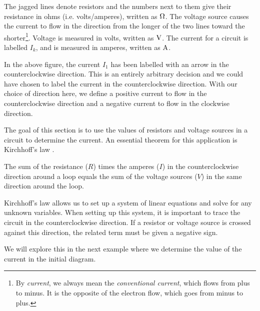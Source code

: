 \documentclass{ximera}
\begin{document}
\noindent
The jagged lines %
  denote resistors and the numbers next
to them give their resistance%
 in ohms (i.e. volts/amperes), written as $\ohm$. The voltage%
 source %
  causes the current%
 to flow in the direction from the longer of the two
lines toward the shorter\footnote{By {\em current}, we always mean the
  {\em conventional current}, which flows from plus to minus. It is
  the opposite of the electron flow, which goes from minus to plus.}.
Voltage is measured in volts, written as $\volt$.  The current for a
circuit is labelled $I_k$, and is measured in amperes, written as
$\amp$.

In the above figure, the current $I_1$ has been labelled with an arrow
in the counterclockwise direction. This is an entirely arbitrary
decision and we could have chosen to label the current in the
counterclockwise direction.  With our choice of direction here, we
define a positive current to flow in the counterclockwise direction
and a negative current to flow in the clockwise direction.

The goal of this section is to use the values of resistors and voltage
sources in a circuit to determine the current. An essential theorem
for this application is Kirchhoff's law%
.

\begin{theorem}\label{th:kirchhoff-law}

  The sum of the resistance ($R$) times the amperes ($I$) in the
  counterclockwise direction around a loop equals the sum of the
  voltage sources ($V$) in the same direction around the loop.
\end{theorem}

Kirchhoff's law allows us to set up a system of linear equations and
solve for any unknown variables. When setting up this system, it is
important to trace the circuit in the counterclockwise direction. If a
resistor or voltage source is crossed against this direction, the
related term must be given a negative sign.

We will explore this in the next example where we determine the value
of the current in the initial diagram.
\end{document}

